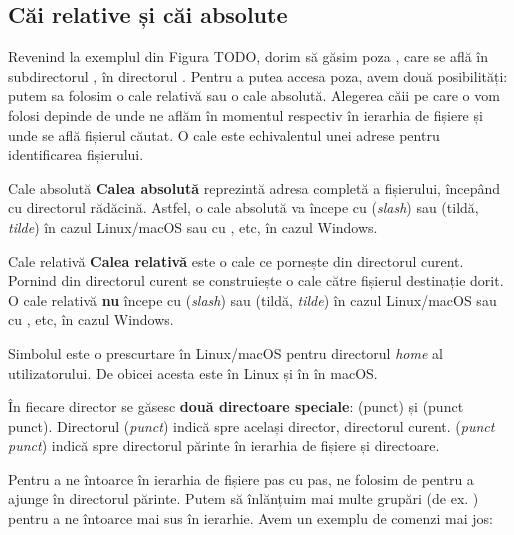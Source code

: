\subsection{Căi relative și căi absolute}
\label{sec:file-system-baza-paths}

Revenind la exemplul din Figura TODO, dorim să găsim poza
, care se află în subdirectorul , în
directorul . Pentru a putea accesa poza, avem două posibilități: putem
sa folosim o cale relativă sau o cale absolută. Alegerea căii pe care o vom
folosi depinde de unde ne aflăm în momentul respectiv în ierarhia de fișiere și
unde se află fișierul căutat. O cale este echivalentul unei adrese pentru identificarea fișierului.

\begin{definition}{Cale absolută}
\textbf{Calea absolută} reprezintă adresa completă a fișierului, începând cu
directorul rădăcină. Astfel, o cale absolută va începe cu \file{/} (\textit{slash}) sau
\file{\textasciitilde{}} (tildă, \textit{tilde}) în cazul Linux/macOS sau cu , 
etc, în cazul Windows.
\end{definition}

\begin{definition}{Cale relativă}
\textbf{Calea relativă} este o cale ce pornește din directorul curent. Pornind din directorul curent se construiește o cale către fișierul destinație dorit. O cale relativă \textbf{nu} începe cu \file{/} (\textit{slash}) sau
\file{\textasciitilde{}} (tildă, \textit{tilde}) în cazul Linux/macOS sau cu , 
etc, în cazul Windows.
\end{definition}

\begin{note}
Simbolul \file{\textasciitilde{}} este o prescurtare în Linux/macOS pentru directorul \textit{home} al utilizatorului. De obicei acesta este  în Linux și în  în macOS.
\end{note}

În fiecare director se găsesc \textbf{două directoare speciale}:  (punct) și  (punct punct). Directorul  (\textit{punct}) indică spre același director, directorul curent.  (\textit{punct punct}) indică spre directorul părinte în ierarhia de fișiere și directoare.

Pentru a ne întoarce în ierarhia de fișiere pas cu pas, ne folosim de  pentru a ajunge în directorul părinte. Putem să înlănțuim mai multe grupări  (de ex. ) pentru a ne întoarce mai sus în ierarhie. Avem un exemplu de comenzi mai jos:

